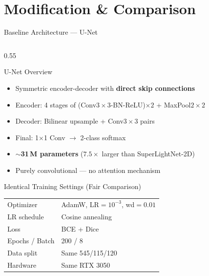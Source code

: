 \documentclass[aspectratio=169,10pt]{beamer}
\begin{document}
\section{Modification \& Comparison}

\begin{frame}{Baseline Architecture --- U-Net \cite{ronneberger2015u}}
  \begin{columns}[T]
    \begin{column}{0.55\textwidth}
      \begin{block}{U-Net Overview}
        \begin{itemize}
          \item Symmetric encoder-decoder with \textbf{direct skip connections}
          \item Encoder: 4 stages of (Conv$3\times3$-BN-ReLU)$\times2$ + MaxPool$2\times2$
          \item Decoder: Bilinear upsample + Conv$3\times3$ pairs
          \item Final: 1$\times$1 Conv $\to$ 2-class softmax
          \item \textbf{$\sim$31\,M parameters} ($7.5\times$ larger than SuperLightNet-2D)
          \item Purely convolutional --- no attention mechanism
        \end{itemize}
      \end{block}
      \vspace{4pt}
      \begin{block}{Identical Training Settings (Fair Comparison)}
        \begin{tabular}{ll}
          Optimizer & AdamW, LR$=10^{-3}$, wd$=0.01$\\
          LR schedule & Cosine annealing\\
          Loss & BCE + Dice\\
          Epochs / Batch & 200 / 8\\
          Data split & Same 545/115/120\\
          Hardware & Same RTX 3050\\
        \end{tabular}
      \end{block}
    \end{column}


\end{columns}
\end{frame}
\end{document}
